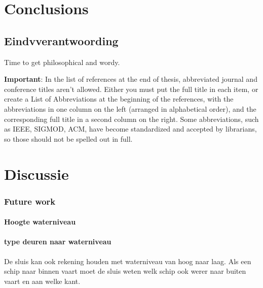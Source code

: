 \chapter{Conclusions}
\label{chapter:Conclusions}
\thispagestyle{myheadings}

\graphicspath{{4_Conclusion/Figures/}}

\section{Eindvverantwoording}
Time to get philosophical and wordy.

{\bf Important}: In the list of references at the end of thesis, abbreviated journal and conference titles aren't allowed. Either you must put the full title in each item, or create a List of Abbreviations at the beginning of the references, with the abbreviations in one column on the left (arranged in alphabetical order), and the corresponding full title in a second column on the right.  Some abbreviations, such as IEEE, SIGMOD, ACM, have become standardized and accepted by librarians, so those should not be spelled out in full.




\chapter{Discussie}

\subsection{Future work}
\subsubsection{Hoogte waterniveau}

\subsubsection{type deuren naar waterniveau}
De sluis kan ook rekening houden met waterniveau van hoog naar laag.
Als een schip naar binnen vaart moet de sluis weten welk schip ook werer naar buiten vaart en aan welke kant.

